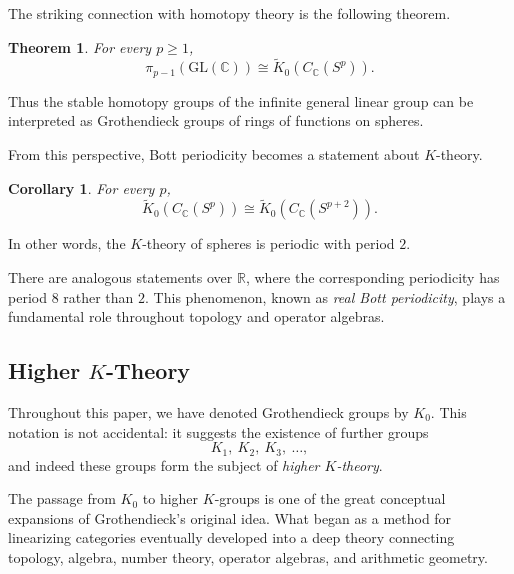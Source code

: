 \documentclass[12pt,reqno]{amsart}
\theoremstyle{plain}
\newtheorem{cor}[thm]{Corollary}
\numberwithin{equation}{section}
\newtheorem{theorem}{Theorem}[section]
\begin{document}
The striking connection with homotopy theory is the following theorem.

\begin{theorem}\label{thm: homotopy and K-theory}
For every $p\ge1$,
\[
\pi_{p-1}(\mathrm{GL}(\mathbb C))
\cong
\widetilde K_0(C_{\mathbb C}(S^p)).
\]
\end{theorem}

Thus the stable homotopy groups of the infinite general linear group can be interpreted as Grothendieck groups of rings of functions on spheres.

From this perspective, Bott periodicity becomes a statement about $K$-theory.

\begin{cor}
For every $p$,
\[
\widetilde K_0(C_{\mathbb C}(S^p))
\cong
\widetilde K_0(C_{\mathbb C}(S^{p+2})).
\]
\end{cor}

In other words, the $K$-theory of spheres is periodic with period $2$.

There are analogous statements over $\mathbb R$, where the corresponding periodicity has period $8$ rather than $2$. This phenomenon, known as \emph{real Bott periodicity}, plays a fundamental role throughout topology and operator algebras.



































\subsection{Higher $K$-Theory}
Throughout this paper, we have denoted Grothendieck groups by $K_0$. This notation is not accidental: it suggests the existence of further groups
\[
K_1,\ K_2,\ K_3,\ \dots,
\]
and indeed these groups form the subject of \emph{higher $K$-theory}.

The passage from $K_0$ to higher $K$-groups is one of the great conceptual expansions of Grothendieck's original idea. What began as a method for linearizing categories eventually developed into a deep theory connecting topology, algebra, number theory, operator algebras, and arithmetic geometry.
\end{document}
